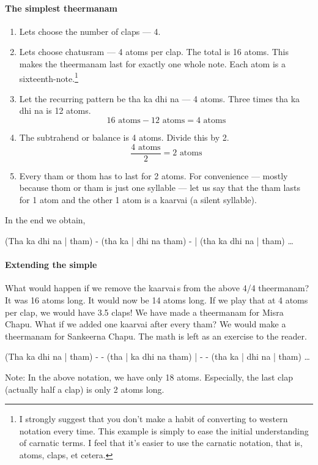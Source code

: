 \paragraph{The simplest theermanam}
\begin{enumerate}
  \item Lets choose the number of claps --- 4.
  \item Lets choose chatusram --- 4 atoms per clap. The total is 16 atoms. This makes
    the theermanam last for exactly one whole note. Each atom is a
    sixteenth-note.\footnote{I strongly suggest that you don't make a habit of
    converting to western notation every time. This example is simply to ease the
    initial understanding of carnatic terms. I feel that it's easier to use the
    carnatic notation, that is, atoms, claps, et cetera.}
  \item Let the recurring pattern be tha ka dhi na --- 4 atoms. Three times tha ka
    dhi na is 12 atoms.
    \[ 16 \text{ atoms} - 12 \text{ atoms} = 4 \text{ atoms} \]
  \item The subtrahend or balance is 4 atoms. Divide this by 2.
    \[ \frac{4 \text{ atoms}}{2} = 2 \text{ atoms} \]
  \item Every tham or thom has to last for 2 atoms. For convenience --- mostly
    because thom or tham is just one syllable --- let us say that the tham lasts for 1
    atom and the other 1 atom is a kaarvai (a silent syllable).
\end{enumerate}
In the end we obtain,
\begin{center}\small\ttfamily
(Tha ka dhi na | tham) - (tha ka | dhi na tham) - | (tha ka dhi na | tham) \ldots
\end{center}

\paragraph{Extending the simple}
What would happen if we remove the kaarvai\,s from the above 4/4 theermanam? It was 16
atoms long. It would now be 14 atoms long. If we play that at 4 atoms per clap, we
would have 3.5 claps! We have made a theermanam for Misra Chapu. What if we added one
kaarvai after every tham? We would make a theermanam for Sankeerna Chapu. The math is
left as an exercise to the reader.
\begin{center}\small\ttfamily
(Tha ka dhi na | tham) - - (tha | ka dhi na tham) | - - (tha ka | dhi na | tham) \ldots
\end{center}
Note: In the above notation, we have only 18 atoms. Especially, the last clap
(actually half a clap) is only 2 atoms long.

